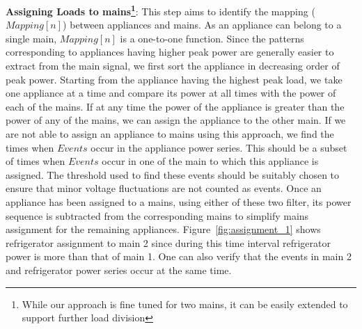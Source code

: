 \documentclass[conference]{IEEEtran}
\newcommand{\figref}[1]{Figure~\ref{#1}}
\begin{document}
\noindent\textbf{Assigning Loads to mains\footnote{While our approach is fine tuned for two mains, it can be easily extended to support further load division}}:
This step aims to identify the mapping ($Mapping[n]$) between appliances and mains. As an appliance can belong to a single main, $Mapping[n]$ is a one-to-one function. Since the patterns corresponding to appliances having higher peak power are generally easier to extract from the main signal, we first sort the appliance in decreasing order of peak power. Starting from the appliance having the highest peak load, we take one appliance at a time and compare its power at all times with the power of each of the mains. If at any time the power of the appliance is greater than the power of any of the mains, we can assign the appliance to the other main. If we are not able to assign an appliance to mains using this approach, we find the times when $Events$ occur in the appliance power series. This should be a subset of times when $Events$ occur in one of the main to which this appliance is assigned. The threshold used to find these events should be suitably chosen to ensure that minor voltage fluctuations are not counted as events. Once an appliance has been assigned to a mains, using either of these two filter, its power sequence is subtracted from the corresponding mains to simplify mains assignment for the remaining appliances. \figref{fig:assignment_1} shows refrigerator assignment to main 2 since during this time interval refrigerator power is more than that of main 1. One can also verify that the events in main 2 and refrigerator power series occur at the same time.
\end{document}
